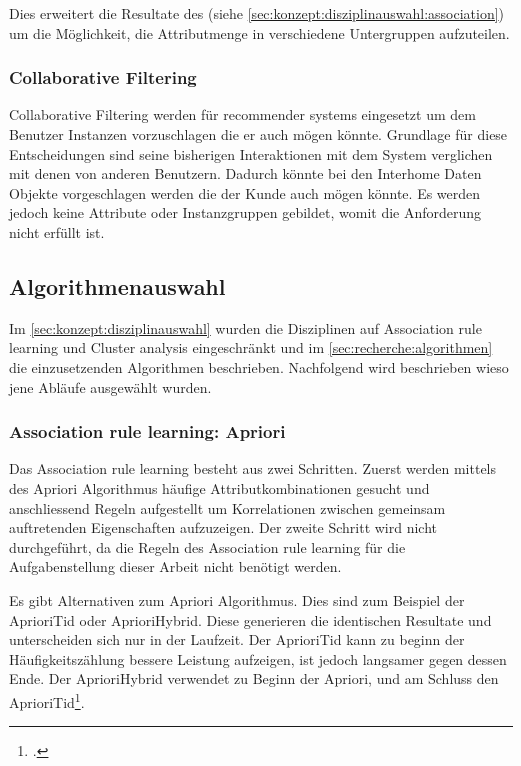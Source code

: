 Dies erweitert die Resultate des  (siehe \cref{sec:konzept:disziplinauswahl:association}) um die Möglichkeit, die Attributmenge in verschiedene Untergruppen aufzuteilen.

\subsubsection{Collaborative Filtering}
\label{sec:konzept:disziplinauswahl:collaborativefiltering}
Collaborative Filtering werden für recommender systems eingesetzt um dem Benutzer Instanzen vorzuschlagen die er auch mögen könnte. Grundlage für diese Entscheidungen sind seine bisherigen Interaktionen mit dem System verglichen mit denen von anderen Benutzern. Dadurch könnte bei den Interhome Daten Objekte vorgeschlagen werden die der Kunde auch mögen könnte. Es werden jedoch keine Attribute oder Instanzgruppen gebildet, womit die Anforderung  nicht erfüllt ist.

\subsection{Algorithmenauswahl}
\label{sec:konzept:algorithmenauswahl}
Im \cref{sec:konzept:disziplinauswahl} wurden die Disziplinen auf Association rule learning und Cluster analysis eingeschränkt und im \cref{sec:recherche:algorithmen} die einzusetzenden Algorithmen beschrieben. Nachfolgend wird beschrieben wieso jene Abläufe ausgewählt wurden.

\subsubsection{Association rule learning: Apriori}
\label{sec:konzept:algorithmenauswahl:apriori}
Das Association rule learning besteht aus zwei Schritten. Zuerst werden mittels des Apriori Algorithmus häufige Attributkombinationen gesucht und anschliessend Regeln aufgestellt um Korrelationen zwischen gemeinsam auftretenden Eigenschaften aufzuzeigen.
Der zweite Schritt wird nicht durchgeführt, da die Regeln des Association rule learning für die Aufgabenstellung dieser Arbeit nicht benötigt werden.

Es gibt Alternativen zum Apriori Algorithmus. Dies sind zum Beispiel der AprioriTid oder AprioriHybrid. Diese generieren die identischen Resultate und unterscheiden sich nur in der Laufzeit. Der AprioriTid kann zu beginn der Häufigkeitszählung bessere Leistung aufzeigen, ist jedoch langsamer gegen dessen Ende. Der AprioriHybrid verwendet zu Beginn der Apriori, und am Schluss den AprioriTid\footcite{association_rule_learning_2017-01-05}. 

